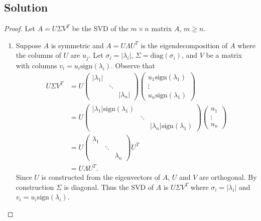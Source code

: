\documentclass[12pt]{report}
\begin{document}
\begin{problem}
\subsection*{Solution}
\begin{proof}
Let $A = U \Sigma V^T$ be the SVD of the $m\times n$ matrix $A$, $m\geq n$. 
\begin{enumerate}
     \item 
     Suppose $A$ is symmetric and $A = U\Lambda U^T$ is the eigendecomposition of $A$ where the columns of $U$ are $u_j$. Let $\sigma_i = |\lambda_i|$, $\Sigma = \text{diag}(\sigma_i)$, and $V$ be a matrix with columns $v_i = u_i \text{sign}(\lambda_i)$. Observe that
     \begin{align*}
          U \Sigma V^T &= U \begin{pmatrix}
               |\lambda_1|\\
               &\ddots\\
               &&|\lambda_n|
          \end{pmatrix}\begin{pmatrix}
               u_1 \text{sign}(\lambda_1)\\
               \vdots\\
               u_n \text{sign}(\lambda_1)
          \end{pmatrix}\\
          &= U \begin{pmatrix}
               |\lambda_1|\text{sign}(\lambda_1)\\
               &\ddots\\
               &&|\lambda_n|\text{sign}(\lambda_1)
          \end{pmatrix}\begin{pmatrix}
               u_1 \\
               \vdots\\
               u_n 
          \end{pmatrix}\\
          &= U \begin{pmatrix}
               \lambda_1\\
               &\ddots\\
               &&\lambda_n
          \end{pmatrix}U^T\\
          &= U \Lambda U^T.
     \end{align*}
     Since $U$ is constructed from the eigenvectors of $A$, $U$ and $V$ are orthogonal. By construction $\Sigma$ is diagonal. Thus the SVD of $A$ is $U\Sigma V^T$ where $\sigma_i = |\lambda_i|$ and $v_i = u_i \text{sign}(\lambda_i)$.
     

\end{enumerate}
\end{proof}
\end{problem}
\end{document}
